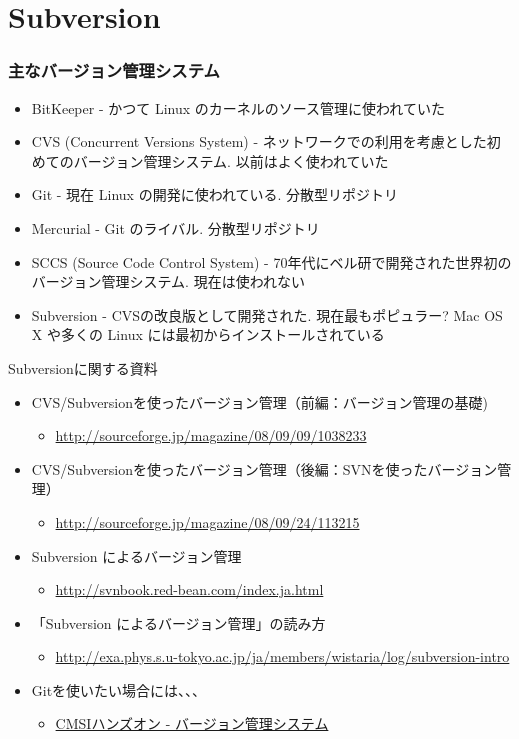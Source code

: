 \section{Subversion}

\begin{frame}
  \frametitle{主なバージョン管理システム}
  \begin{itemize}
  \item BitKeeper - かつて Linux のカーネルのソース管理に使われていた
  \item CVS (Concurrent Versions System) - ネットワークでの利用を考慮とした初めてのバージョン管理システム. 以前はよく使われていた
  \item Git - 現在 Linux の開発に使われている. 分散型リポジトリ
  \item Mercurial - Git のライバル. 分散型リポジトリ
  \item SCCS (Source Code Control System) - 70年代にベル研で開発された世界初のバージョン管理システム. 現在は使われない
  \item {\color{red}Subversion} - CVSの改良版として開発された. 現在最もポピュラー? Mac OS X や多くの Linux には最初からインストールされている
  \end{itemize}
\end{frame}

\begin{frame}[t,fragile]{Subversionに関する資料}
  \begin{itemize}
  \item CVS/Subversionを使ったバージョン管理（前編：バージョン管理の基礎)
    \begin{itemize}
    \item \url{http://sourceforge.jp/magazine/08/09/09/1038233}
    \end{itemize}
  \item CVS/Subversionを使ったバージョン管理（後編：SVNを使ったバージョン管理）
    \begin{itemize}
      \item \url{http://sourceforge.jp/magazine/08/09/24/113215}
    \end{itemize}
  \item Subversion によるバージョン管理
    \begin{itemize}
      \item \url{http://svnbook.red-bean.com/index.ja.html}
    \end{itemize}
  \item 「Subversion によるバージョン管理」の読み方
    \begin{itemize}
      \item \url{http://exa.phys.s.u-tokyo.ac.jp/ja/members/wistaria/log/subversion-intro}
    \end{itemize}
  \item Gitを使いたい場合には、、、
    \begin{itemize}
      \item \href{http://www.cms-initiative.jp/ja/research-support/develop-support/how-to-publish/develop-apps/dt0l33/manage-version}{CMSIハンズオン - バージョン管理システム}
    \end{itemize}
  \end{itemize}
\end{frame}


